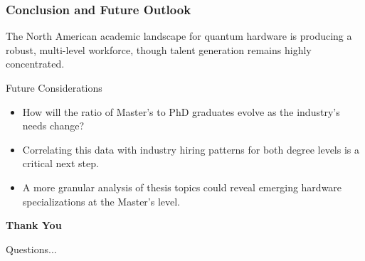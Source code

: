 \documentclass[aspectratio=169]{beamer}
\begin{document}
\begin{frame}
    \frametitle{Conclusion and Future Outlook}
    
    The North American academic landscape for quantum hardware is producing a robust, multi-level workforce, though talent generation remains highly concentrated.
    
    \begin{block}{Future Considerations}
        \begin{itemize}
            \item How will the ratio of Master's to PhD graduates evolve as the industry's needs change?
            \item Correlating this data with industry hiring patterns for both degree levels is a critical next step.
            \item A more granular analysis of thesis topics could reveal emerging hardware specializations at the Master's level.
        \end{itemize}
    \end{block}
    
    \vfill
    
    \begin{center}
        \Huge \textbf{Thank You}
        \vspace{0.5em}
        
        \Large Questions...
    \end{center}
\end{frame}
\end{document}
